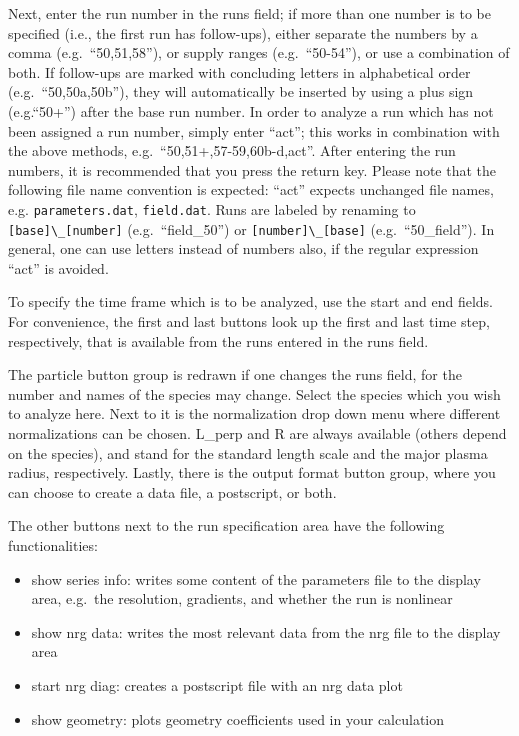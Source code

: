 \documentclass[12pt]{article}
\begin{document}
Next, enter the run number in the runs field; if more than one
number is to be specified (i.e., the first run has follow-ups),
either separate the numbers by a comma (e.g.~``50,51,58''), or
supply ranges (e.g.~``50-54''), or use a combination of both. 
If follow-ups are marked with concluding letters in 
alphabetical order (e.g.~``50,50a,50b''), they will automatically
be inserted by using a plus sign (e.g.``50+'') after the base 
run number. In
order to analyze a run which has not been assigned a run number,
simply enter ``act''; this works in combination with the above
methods, e.g.~``50,51+,57-59,60b-d,act''. After entering the run 
numbers, it is recommended that you press the return key. Please 
note that the following file name convention is expected: ``act'' 
expects unchanged file names, e.g. \verb|parameters.dat|,
\verb|field.dat|. Runs are labeled by renaming to
\verb|[base]\_[number]| (e.g.~``field\_50'') or
\verb|[number]\_[base]| (e.g.~``50\_field''). In general, one can
use letters instead of numbers also, if the regular expression
``act'' is avoided.

To specify the time frame which is to be analyzed, use the start
and end fields. For convenience, the first and last buttons look
up the first and last time step, respectively, that is available
from the runs entered in the runs field.

The particle button group is redrawn if one changes the runs
field, for the number and names of the species may change. Select
the species which you wish to analyze here. Next to it is the
normalization drop down menu where different normalizations can be
chosen. L\_perp and R are always available (others depend on the
species), and stand for the standard \gene length scale and the
major plasma radius, respectively. Lastly, there is the output
format button group, where you can choose to create a data file, a
postscript, or both.

The other buttons next to the run specification area have the
following functionalities:
\begin{itemize}
\item show series info: writes some content of the parameters file
to the display area, e.g.~the resolution, gradients, and whether
the run is nonlinear 
\item show nrg data: writes the most relevant data from the nrg 
file to the display area 
\item start nrg diag: creates a postscript file with an nrg data plot 
\item show geometry: plots geometry coefficients used in your
\gene calculation
\end{itemize}
\end{document}
